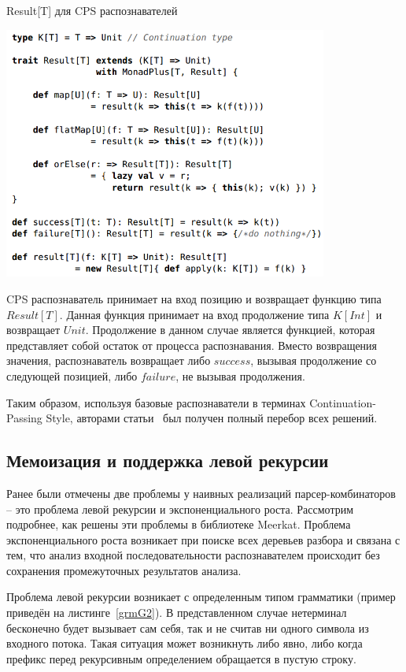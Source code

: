 \begin{listing}
\caption{Result[T] для CPS распознавателей}
\label{result}
\centering
\includegraphics[width=0.8\textwidth]{Smolina/pics/result.png}
\end{listing}

CPS распознаватель принимает на вход позицию и возвращает функцию типа $Result[T]$. Данная функция принимает на вход продолжение типа $K[Int]$ и возвращает $Unit$. Продолжение в данном случае является функцией, которая представляет собой остаток от процесса распознавания. Вместо возвращения значения, распознаватель возвращает либо $success$, вызывая продолжение со следующей позицией, либо $failure$, не вызывая продолжения.

Таким образом, используя базовые распознаватели в терминах Continuation-Passing Style, авторами статьи~\cite{GLL} был получен полный перебор всех решений.

\subsection{Мемоизация и поддержка левой рекурсии}
Ранее были отмечены две проблемы у наивных реализаций парсер-комбинаторов – это проблема левой рекурсии и экспоненциального роста. Рассмотрим подробнее, как решены эти проблемы в библиотеке Meerkat. Проблема экспоненциального роста возникает при поиске всех деревьев разбора и связана с тем, что анализ входной последовательности распознавателем происходит без сохранения промежуточных результатов анализа.

Проблема левой рекурсии возникает с определенным типом грамматики (пример приведён на листинге~\ref{grmG2}). В представленном случае нетерминал бесконечно будет вызывает сам себя, так и не считав ни одного символа из входного потока. Такая ситуация может возникнуть либо явно,
либо когда префикс перед рекурсивным определением обращается в пустую строку.

